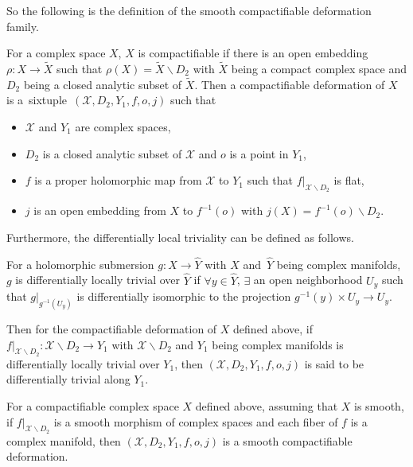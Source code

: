 \documentclass[10pt,a4paper]{amsart}
\numberwithin{equation}{section}
\begin{document}
So the following is the definition of the smooth compactifiable deformation family.

\begin{Definition} \label{Definition3.10}
For a complex space $X$, $X$ is compactifiable if there is an open embedding $\rho\colon X\rightarrow \widetilde{X}$ such that $\rho(X)=\widetilde{X} \backslash D_2$ with $\widetilde{X}$ being a compact complex space and $D_2$ being a closed analytic subset of $\widetilde{X}$. Then a compactifiable deformation of $X$ is a~sixtuple~$(\mathcal{X},D_2,Y_1,f,o,j)$ such that
\begin{itemize}\itemsep=0pt
\item[$(1)$] $\mathcal{X}$ and $Y_1$ are complex spaces,
\item[$(2)$] $D_2$ is a closed analytic subset of $\mathcal{X}$ and $o$ is a point in $Y_1$,
\item[$(3)$] $f$ is a proper holomorphic map from $\mathcal{X}$ to $Y_1$ such that $f|_{\mathcal{X} \backslash D_2}$ is flat,
\item[$(4)$] $j$ is an open embedding from $X$ to $f^{-1}(o)$ with $j(X)=f^{-1}(o)\backslash D_2$.
\end{itemize}
\end{Definition}

Furthermore, the differentially local triviality can be defined as follows.

\begin{Definition} \label{Definition3.11}
For a holomorphic submersion $g\colon X \rightarrow \hat{Y}$ with $X$ and~$\hat{Y}$ being complex manifolds, $g$ is differentially locally trivial over $\hat{Y}$ if $\forall y \in \hat{Y}$, $\exists$ an open neighborhood $U_y$ such that $g|_{g^{-1}(U_y)}$ is differentially isomorphic to the projection ${g^{-1}(y) \times U_y \rightarrow U_y}$.
\end{Definition}

Then for the compactifiable deformation of $X$ defined above, if $f|_{\mathcal{X} \backslash D_2 }\colon \mathcal{X} \backslash D_2\rightarrow Y_1$ with $\mathcal{X} \backslash D_2$ and $Y_1$ being complex manifolds is differentially locally trivial over $Y_1$, then $(\mathcal{X}, D_2, Y_1,f,\allowbreak o,j)$ is said to be differentially trivial along $Y_1$.

\begin{Definition} \label{Definition3.12}
For a compactifiable complex space $X$ defined above, assuming that $X$ is smooth, if $f|_{\mathcal{X}\backslash D_2}$ is a smooth morphism of complex spaces and each fiber of $f$ is a complex manifold, then $(\mathcal{X}, D_2, Y_1,f, o, j)$ is a smooth compactifiable deformation.
\end{Definition}
\end{document}
